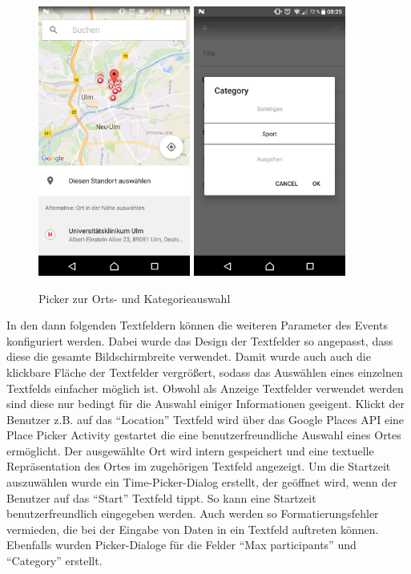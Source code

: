 \documentclass{scrartcl}
\begin{document}
\begin{figure}[h!tbp]
  \centering
  \includegraphics[width=5cm]{img/addevent_places}
  \hspace{1cm}
  \includegraphics[width=5cm]{img/addevent_category}
  \caption{Picker zur Orts- und Kategorieauswahl}
\end{figure}

In den dann folgenden Textfeldern können die weiteren Parameter des Events
konfiguriert werden. Dabei wurde das Design der Textfelder so angepasst, dass
diese die gesamte Bildschirmbreite verwendet. Damit wurde auch auch die
klickbare Fläche der Textfelder vergrößert, sodass das Auswählen eines einzelnen
Textfelds einfacher möglich ist. Obwohl als Anzeige Textfelder verwendet werden
sind diese nur bedingt für die Auswahl einiger Informationen geeigent. Klickt
der Benutzer z.B. auf das \enquote{Location} Textfeld wird über das Google
Places API eine Place Picker Activity gestartet die eine benutzerfreundliche
Auswahl eines Ortes ermöglicht. Der ausgewählte Ort wird intern gespeichert und
eine textuelle Repräsentation des Ortes im zugehörigen Textfeld angezeigt. Um
die Startzeit auszuwählen wurde ein Time-Picker-Dialog erstellt, der geöffnet
wird, wenn der Benutzer auf das \enquote{Start} Textfeld tippt. So kann eine
Startzeit benutzerfreundlich eingegeben werden. Auch werden so
Formatierungsfehler vermieden, die bei der Eingabe von Daten in ein Textfeld
auftreten können. Ebenfalls wurden Picker-Dialoge für die Felder
\enquote{Max participants} und \enquote{Category} erstellt.
\end{document}
